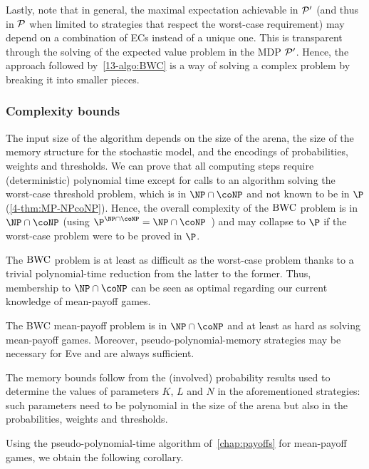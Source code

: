 \begin{example}
Lastly, note that in general, the maximal expectation achievable in ${\mathcal{P}} '$ (and thus in ${\mathcal{P}} $ when limited to strategies that respect the worst-case requirement) may depend on a combination of ECs instead of a unique one. This is transparent through the solving of the expected value problem in the MDP ${\mathcal{P}} '$. Hence, the approach followed by~\cref{13-algo:BWC} is a way of solving a complex problem by breaking it into smaller pieces.
\end{example}

\subsubsection*{Complexity bounds} The input size of the algorithm depends on the size of the arena, the size of the memory structure for the stochastic model, and the encodings of probabilities, weights and thresholds. We can prove that all computing steps require (deterministic) polynomial time except for calls to an algorithm solving the worst-case threshold problem, which is in $\NP \cap \coNP$ and not known to be in $\P$ (\cref{4-thm:MP-NPcoNP}). Hence, the overall complexity of the $\text{BWC}$ problem is in $\NP \cap \coNP$ (using $\P^{\NP \cap \coNP} = \NP \cap \coNP$~\cite{Brassard:1979}) and may collapse to $\P$ if the worst-case problem were to be proved in $\P$.

The $\text{BWC}$ problem is at least as difficult as the worst-case problem thanks to a trivial polynomial-time reduction from the latter to the former. Thus, membership to $\NP \cap \coNP$ can be seen as optimal regarding our current knowledge of mean-payoff games.

\begin{theorem}
\label{13-thm:bwcDecisionProblem}
The BWC mean-payoff problem is in $\NP \cap \coNP$ and at least as hard as solving mean-payoff games. Moreover, pseudo-polynomial-memory strategies may be necessary for Eve and are always sufficient.
\end{theorem}

The memory bounds follow from the (involved) probability results used to determine the values of parameters $K$, $L$ and $N$ in the aforementioned strategies: such parameters need to be polynomial in the size of the arena but also in the probabilities, weights and thresholds.

Using the pseudo-polynomial-time algorithm of~\cref{chap:payoffs} for mean-payoff games,  we obtain the following corollary.

